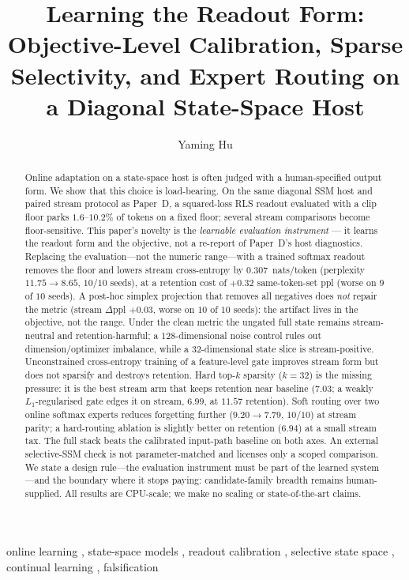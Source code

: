 \documentclass[preprint,12pt]{elsarticle}
\begin{document}
\begin{frontmatter}

\title{Learning the Readout Form: Objective-Level Calibration, Sparse
Selectivity, and Expert Routing on a Diagonal State-Space Host}

\author[a]{Yaming Hu}
\address[a]{Independent Researcher, Guiyang, Guizhou, China}

\begin{abstract}
Online adaptation on a state-space host is often judged with a
human-specified output form. We show that this choice is load-bearing.
On the same diagonal SSM host and paired stream protocol as Paper~D, a
squared-loss RLS readout
evaluated with a clip floor parks $1.6$--$10.2\%$ of tokens on a
fixed floor; several stream comparisons become floor-sensitive.
This paper's novelty is the \emph{learnable evaluation instrument}
--- it learns the readout form and the objective, not a re-report of
Paper~D's host diagnostics.
Replacing the evaluation---not the numeric range---with a
trained softmax readout removes the floor and
lowers stream cross-entropy by $0.307$~nats/token (perplexity
$11.75\to8.65$, $10/10$ seeds), at a retention cost of $+0.32$
same-token-set ppl (worse on $9$ of $10$ seeds). A post-hoc simplex
projection that
removes all negatives does \emph{not} repair the metric
(stream $\Delta$ppl $+0.03$, worse on $10$ of $10$ seeds): the artifact
lives in the
objective, not the range. Under the clean metric the ungated full
state remains stream-neutral and retention-harmful; a $128$-dimensional
noise control rules out dimension/optimizer imbalance, while a
$32$-dimensional state slice is stream-positive. Unconstrained
cross-entropy training of a feature-level gate improves stream form
but does not sparsify and destroys retention. Hard top-$k$ sparsity
($k=32$) is the missing pressure: it is the best stream arm that keeps
retention near baseline ($7.03$; a weakly $L_1$-regularised gate edges
it on stream, $6.99$, at $11.57$ retention). Soft routing over two online
softmax experts reduces forgetting further ($9.20\to7.79$,
$10/10$) at stream parity; a hard-routing ablation is slightly better
on retention ($6.94$) at a small stream tax. The full stack beats the calibrated
input-path baseline on both axes. An external selective-SSM check is
not parameter-matched and licenses only a scoped comparison. We state a
design rule---the
evaluation instrument must be part of the learned system---and the
boundary where it stops paying: candidate-family breadth remains
human-supplied. All results are CPU-scale; we make no scaling or
state-of-the-art claims.
\end{abstract}

\begin{keyword}
online learning \sep
state-space models \sep
readout calibration \sep
selective state space \sep
continual learning \sep
falsification
\end{keyword}

\end{frontmatter}
\end{document}
